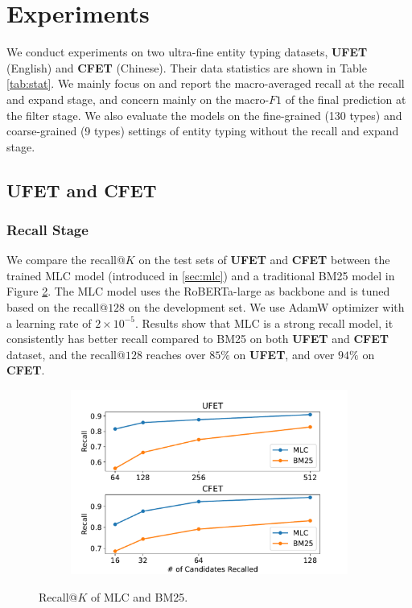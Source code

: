 \section{Experiments}
We conduct experiments on two ultra-fine entity typing datasets, {\bf \textsc{UFET}} (English) and {\bf \textsc{CFET}} (Chinese). Their data statistics are shown in Table \ref{tab:stat}. We mainly focus on and report the macro-averaged recall at the recall and expand stage, and concern mainly on the macro-$F1$ of the final prediction at the filter stage. We also evaluate the {\bf \textsc{\name}} models on the fine-grained (130 types) and coarse-grained (9 types) settings of entity typing without the recall and expand stage.
\subsection{UFET and CFET}
\subsubsection{Recall Stage}
\label{sec:recall}
We compare the recall@$K$ on the test sets of {\bf \textsc{UFET}} and {\bf\textsc{CFET}} between the trained MLC model (introduced in \ref{sec:mlc}) and a traditional BM25 model \cite{bm25} in Figure \ref{fig:recall}. The MLC model uses the RoBERTa-large as backbone and is tuned based on the recall@$128$ on the development set. We use AdamW optimizer with a learning rate of $2\times10^{-5}$. Results show that MLC is a strong recall model, it consistently has better recall compared to BM25 on both {\bf\textsc{UFET}} and {\bf\textsc{CFET}} dataset, and the recall@$128$ reaches over $85\%$ on {\bf \textsc{UFET}}, and over $94\%$ on {\bf \textsc{CFET}}.

\begin{figure}[t]
     \centering
     \begin{subfigure}[h]{0.5\textwidth}
         \centering
         \includegraphics[width=\textwidth]{src/img/recall_compare_bm25.pdf}
         \label{fig:mb2}
     \end{subfigure}   
 \caption{Recall@$K$ of MLC and BM25.}
 \label{fig:recall}
\end{figure}

